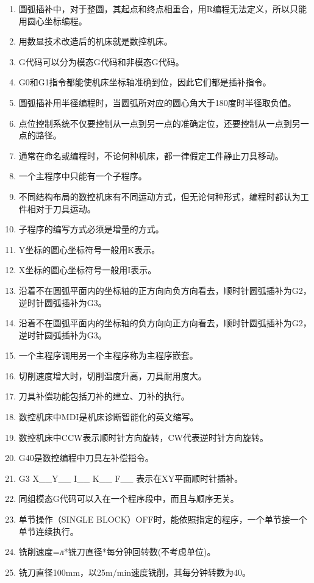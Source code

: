 \documentclass[12pt,twocolumn,landscape,UTF8,twoside]{ctexart}
\begin{document}
\begin{spacing}{1.3}
\begin{enumerate} [1、]
\item 圆弧插补中，对于整圆，其起点和终点相重合，用R编程无法定义，所以只能用圆心坐标编程。
\item 用数显技术改造后的机床就是数控机床。
\item G代码可以分为模态G代码和非模态G代码。
\item G0和G1指令都能使机床坐标轴准确到位，因此它们都是插补指令。
\item 圆弧插补用半径编程时，当圆弧所对应的圆心角大于180度时半径取负值。
\item 点位控制系统不仅要控制从一点到另一点的准确定位，还要控制从一点到另一点的路径。
\item 通常在命名或编程时，不论何种机床，都一律假定工件静止刀具移动。
\item 一个主程序中只能有一个子程序。
\item 不同结构布局的数控机床有不同运动方式，但无论何种形式，编程时都认为工件相对于刀具运动。
\item 子程序的编写方式必须是增量的方式。
\item Y坐标的圆心坐标符号一般用K表示。
\item X坐标的圆心坐标符号一般用I表示。
\item 沿着不在圆弧平面内的坐标轴的正方向向负方向看去，顺时针圆弧插补为G2，逆时针圆弧插补为G3。
\item 沿着不在圆弧平面内的坐标轴的负方向向正方向看去，顺时针圆弧插补为G2，逆时针圆弧插补为G3。
\item 一个主程序调用另一个主程序称为主程序嵌套。
\item 切削速度增大时，切削温度升高，刀具耐用度大。
\item 刀具补偿功能包括刀补的建立、刀补的执行。
\item 数控机床中MDI是机床诊断智能化的英文缩写。
\item 数控机床中CCW表示顺时针方向旋转，CW代表逆时针方向旋转。
\item G40是数控编程中刀具左补偿指令。
\item G3 X\_\_Y\_\_ I\_\_ K\_\_ F\_\_ 表示在XY平面顺时针插补。
\item 同组模态G代码可以入在一个程序段中，而且与顺序无关。
\item 单节操作（SINGLE BLOCK）OFF时，能依照指定的程序，一个单节接一个单节连续执行。
\item 铣削速度=л*铣刀直径*每分钟回转数(不考虑单位)。
\item 铣刀直径100mm，以25m/min速度铣削，其每分钟转数为40。

\end{enumerate}
\end{spacing}
\end{document}
